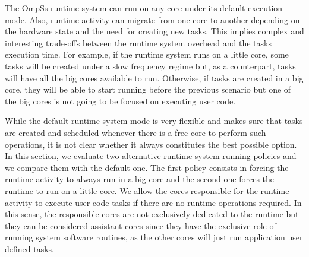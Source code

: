 

\iffalse
The OmpSs runtime system can run on any core under its default execution mode.                                                                                                                                                               
Also, runtime activity can migrate from one core to another depending on the hardware state and the need for creating new tasks.                                                                                                             
This implies complex and interesting trade-offs between the runtime system overhead and the tasks execution time.                                                                                                                            
For example, if the runtime system runs on a little core, some tasks                                                                                                                                                                         
will be created under a slow frequency regime but, as a counterpart, tasks will have all the big cores                                                                                                                                      
available to run.                                                                                                                                                                                                                            
Otherwise, if tasks are created in a big core, they will be able to start running before the previous scenario                                                                                                                              
but one of the big cores is not going to be focused on executing user code.                                                                                                                                                                 

While the default runtime system mode is very flexible and makes sure that tasks are created and scheduled whenever there is a free core to perform such operations, it is not clear whether it always constitutes the best possible option. 
In this section, we evaluate two alternative runtime system running policies and we compare them with the default one.                                                                                                                       
The first policy consists in forcing the runtime activity to always run in a big core and the second one forces the runtime to run on a little core.                                                                                        
We allow the cores responsible for the runtime activity to execute user code tasks if there are no runtime operations required.
In this sense, the responsible cores are not exclusively dedicated to the runtime but they can be considered assistant cores since they have the exclusive role of running system software routines, as the other cores will just run application user defined tasks.


